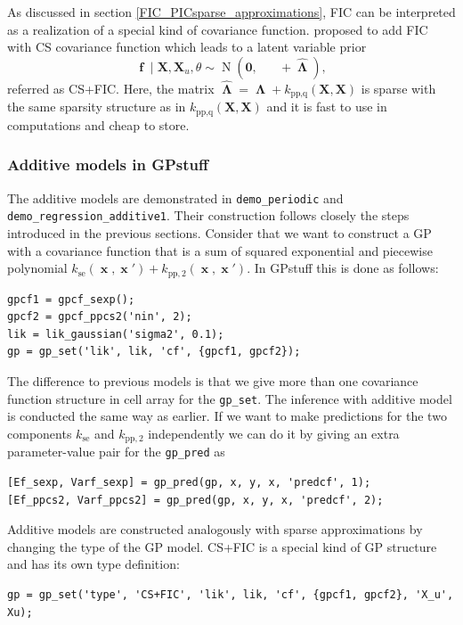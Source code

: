 \documentclass[twoside,11pt]{article}
\DeclareMathOperator{\Kfu}{\mathbf{K}_{f,u}}
\DeclareMathOperator{\Kuf}{\mathbf{K}_{u,f}}
\DeclareMathOperator{\iKuu}{\mathbf{K}_{u,u}^{-1}}
\DeclareMathOperator{\x}{\mathbf{x}}
\DeclareMathOperator{\f}{\mathbf{f}}
\DeclareMathOperator{\LL}{\mathbf{\Lambda}}
\DeclareMathOperator{\N}{N}
\newcommand{\mb}{\mathbf}
\newcommand{\pkg}[1]{{\fontseries{b}\selectfont #1}}
\newcommand{\code}[1]{{\normalfont\texttt{#1}}}
\begin{document}
As discussed in section \ref{FIC_PICsparse_approximations}, FIC can be
interpreted as a realization of a special kind of covariance function.
\citet{Vanhatalo+Vehtari:2008} proposed to add FIC with CS covariance
function which leads to a latent variable prior
%
\begin{equation}\label{GP_CS+FIC_prior}
\f \mid \mb{X}, \mb{X}_{u}, \theta \sim \N(\mb{0},
\Kfu\iKuu\Kuf+\hat{\LL}),
\end{equation}
%
referred as CS+FIC. Here, the matrix
$\hat{\LL}=\LL+k_{\text{pp,q}}(\mb{X},\mb{X})$ is sparse with the same
sparsity structure as in $k_{\text{pp,q}}(\mb{X},\mb{X})$ and it is
fast to use in computations and cheap to store. 

\subsubsection{Additive models in GPstuff}

The additive models are demonstrated in \code{demo\_periodic} and
\code{demo\_regression\_additive1}. Their construction follows closely the
steps introduced in the previous sections. Consider that we want to
construct a GP with a covariance function that is a sum of squared
exponential and piecewise polynomial $k_{\text{se}}(\x,\x') +
k_{\text{pp},2}(\x,\x')$. In \pkg{GPstuff} this is done as follows:
%
\begin{verbatim}
gpcf1 = gpcf_sexp();
gpcf2 = gpcf_ppcs2('nin', 2);
lik = lik_gaussian('sigma2', 0.1);
gp = gp_set('lik', lik, 'cf', {gpcf1, gpcf2}); 
\end{verbatim}
%
The difference to previous models is that we give more than one
covariance function structure in cell array for the \code{gp\_set}.
The inference with additive model is conducted the same way as
earlier. If we want to make predictions for the two components
$k_{\text{se}}$ and $k_{\text{pp},2}$ independently we can do it by
giving an extra parameter-value pair for the \code{gp\_pred} as
%
\begin{verbatim}
[Ef_sexp, Varf_sexp] = gp_pred(gp, x, y, x, 'predcf', 1);
[Ef_ppcs2, Varf_ppcs2] = gp_pred(gp, x, y, x, 'predcf', 2);
\end{verbatim}

Additive models are constructed analogously with sparse approximations
by changing the type of the GP model. CS+FIC is a special kind of GP
structure and has its own type definition:
%
\begin{verbatim}
gp = gp_set('type', 'CS+FIC', 'lik', lik, 'cf', {gpcf1, gpcf2}, 'X_u', Xu);
\end{verbatim}
\end{document}
